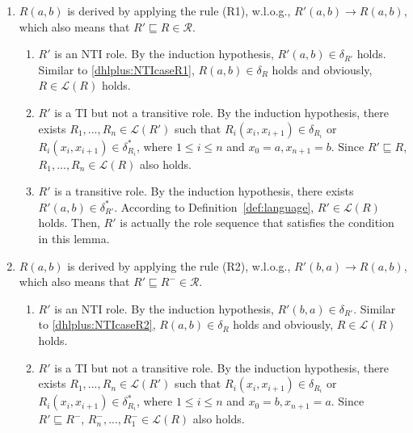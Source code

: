 \documentclass[final,1p,times]{elsarticle}
\begin{document}
\begin{enumerate}[leftmargin=12ex,label=Case~3.\arabic*, ref=Case~3.\arabic*]
\item $R(a,b)$ is derived by applying the rule (R1), w.l.o.g., $R'(a,b)\rightarrow R(a,b)$,
    which also means that $R'\sqsubseteq R\in\mathcal{R}$.\label{dhlplus:TIcaseR1}

    \begin{enumerate}[leftmargin=8ex,label=Case~3.1.\arabic*]
    \item $R'$ is an NTI role. By the induction hypothesis, $R'(a,b)\in\delta_{R'}$ holds.
        Similar to \ref{dhlplus:NTIcaseR1}, $R(a,b)\in\delta_{R}$ holds and
        obviously, $R\in\mathcal{L}(R)$ holds.

    \item $R'$ is a TI but not a transitive role.
        By the induction hypothesis, there exists $R_1,...,R_n\in\mathcal{L}(R')$
        such that $R_i(x_i,x_{i+1})\in\delta_{R_i}$ or $R_i(x_i,x_{i+1})\in\delta^*_{R_i}$, where $1\leq i\leq n$
        and $x_0=a, x_{n+1}=b$. Since $R'\sqsubseteq R$, $R_1,...,R_n\in\mathcal{L}(R)$ also holds.

    \item $R'$ is a transitive role.
        By the induction hypothesis, there exists $R'(a,b)\in\delta^*_{R'}$.
        According to Definition~\ref{def:language}, $R'\in\mathcal{L}(R)$ holds.
        Then, $R'$ is actually the role sequence that satisfies the condition
        in this lemma.
    \end{enumerate}

\item $R(a,b)$ is derived by applying the rule (R2), w.l.o.g., $R'(b,a)\rightarrow R(a,b)$,
    which also means that $R'\sqsubseteq R^-\in\mathcal{R}$.

    \begin{enumerate}[leftmargin=8ex,label=Case~3.2.\arabic*]
    \item $R'$ is an NTI role. By the induction hypothesis, $R'(b,a)\in\delta_{R'}$.
        Similar to \ref{dhlplus:NTIcaseR2}, $R(a,b)\in\delta_{R}$ holds and
        obviously, $R\in\mathcal{L}(R)$ holds.

    \item $R'$ is a TI but not a transitive role. By the induction hypothesis, there exists $R_1,...,R_n\in\mathcal{L}(R')$
        such that $R_i(x_i,x_{i+1})\in\delta_{R_i}$ or $R_i(x_i,x_{i+1})\in\delta^*_{R_i}$, where $1\leq i\leq n$
        and $x_0=b, x_{n+1}=a$. Since $R'\sqsubseteq R^-$, $R_n^-,...,R_1^-\in\mathcal{L}(R)$ also holds.


\end{enumerate}
\end{enumerate}
\end{document}
